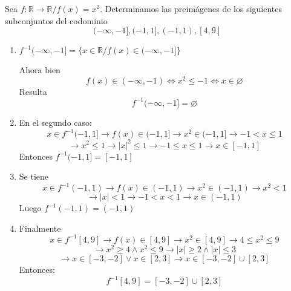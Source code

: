 \begin{fmd-example}[Preimagen]
	Sea $f: \mathbb{R} \rightarrow \mathbb{R} / f(x) = x^2$. Determinamos las preimágenes
	de los siguientes subconjuntos del codominio
	\[ (-\infty, -1], (-1, 1], (-1, 1), [4,9] \]
	\begin{enumerate}[label=\roman*)]
		\item $f^{-1} (-\infty, -1] = \{ x \in \mathbb{R} / f(x) \in (-\infty, -1] \}$
		
		Ahora bien \[ f(x) \in (-\infty, -1) \iff x^2 \le -1 \iff x \in \varnothing \]
		Resulta
		\[ f^{-1} (-\infty, -1] = \varnothing \]
	\end{enumerate}
	
	
	\begin{enumerate}[label=\roman*)]
		\setcounter{enumi}{1}
		\item En el segundo caso:
		\[ x \in f^{-1}(-1, 1] \rightarrow f(x) \in (-1, 1] \rightarrow x^2 \in (-1, 1]
		\rightarrow -1 < x \le 1\]
		\[ \rightarrow x^2 \le 1 \rightarrow |x|^2 \le 1 \rightarrow -1 \le x \le 1
		\rightarrow x \in [-1, 1] \]
		Entonces $f^{-1}(-1, 1] = [-1, 1]$
		\item Se tiene \[ x \in f^{-1}(-1,1) \rightarrow f(x) \in (-1,1) \rightarrow
		x^2 \in (-1, 1) \rightarrow x^2 < 1 \]
		\[ \rightarrow |x| < 1  \rightarrow -1 < x < 1 \rightarrow x \in (-1, 1)\]
		Luego $f^{-1} (-1,1) = (-1,1)$
	\end{enumerate}
	
	\begin{enumerate}[label=\roman*)]
		\setcounter{enumi}{3}
		\item Finalmente
		\[ x \in f^{-1}[4,9] \rightarrow f(x) \in [4,9] \rightarrow x^2 \in [4,9]
		\rightarrow 4 \le x^2 \le 9 \]
		\[ \rightarrow x^2 \ge 4 \land x^2 \le 9 \rightarrow |x| \ge 2 \land |x|\le 3
		\]
		\[ \rightarrow x \in [-3, -2] \vee x \in [2, 3] \rightarrow x \in [-3,-2] 
		\cup [2,3] \]
		Entonces: \[ f^{-1}[4,9] = [-3, -2] \cup [2,3] \]
	\end{enumerate}
\end{fmd-example}

